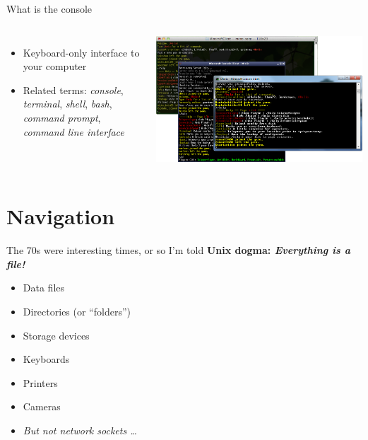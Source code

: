     \begin{frame}[t,fragile]{What is the console}
        \begin{columns}[T]
            \begin{itemize}
                \item Keyboard-only interface to your computer
                \item Related terms: \emph{console}, \emph{terminal},
                    \emph{shell}, \emph{bash}, \emph{command prompt},
                    \emph{command line interface}
            \end{itemize}
            \includegraphics[width=\columnwidth]{img/consoles.png}
        \end{columns}
    \end{frame}

    \section{Navigation}

    \begin{frame}[t,fragile]{The 70s were interesting times, or so I'm told}
        \textbf{Unix dogma: \emph{Everything is a file!}} \\
        \begin{itemize}
            \item Data files
            \item Directories (or ``folders'')
            \item Storage devices
            \item Keyboards
            \item Printers
            \item Cameras
            \item \emph{But not network sockets \ldots}
        \end{itemize}
    \end{frame}

